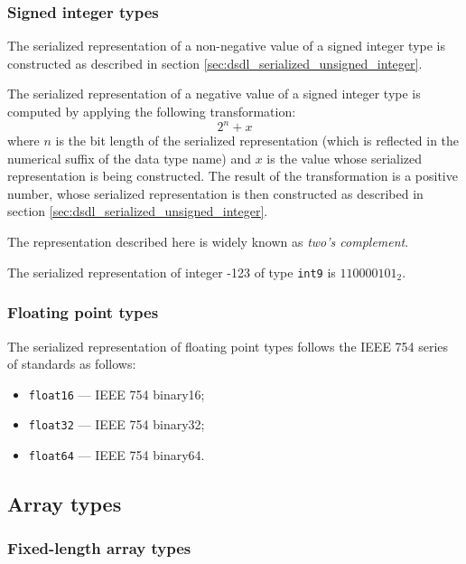 \subsubsection{Signed integer types}

The serialized representation of a non-negative value of a signed integer type is constructed as described
in section \ref{sec:dsdl_serialized_unsigned_integer}.

The serialized representation of a negative value of a signed integer type is computed by
applying the following transformation:
$$2^n + x$$
where $n$ is the bit length of the serialized representation
(which is reflected in the numerical suffix of the data type name)
and $x$ is the value whose serialized representation is being constructed.
The result of the transformation is a positive number,
whose serialized representation is then constructed as described in section \ref{sec:dsdl_serialized_unsigned_integer}.

The representation described here is widely known as \emph{two's complement}.

\begin{remark}
    The serialized representation of integer -123 of type \verb|int9| is $110000101_2$.
\end{remark}

\subsubsection{Floating point types}

The serialized representation of floating point types follows the IEEE 754 series of standards as follows:

\begin{itemize}
    \item \verb|float16| --- IEEE 754 binary16;
    \item \verb|float32| --- IEEE 754 binary32;
    \item \verb|float64| --- IEEE 754 binary64.
\end{itemize}

\subsection{Array types}

\subsubsection{Fixed-length array types}


